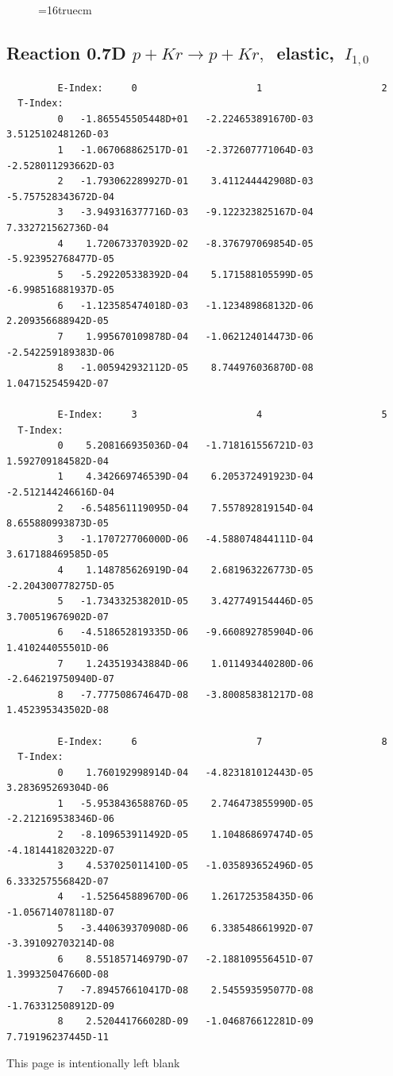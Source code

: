 \documentclass[12pt,dvips]{article}
\begin{document}
\begin{figure} \label{0.7T}
\epsfxsize=16truecm
\end{figure}
\newpage

\subsection{
Reaction 0.7D  $p + Kr \rightarrow p + Kr ,\ $
 elastic, $\  I_{1,0}$
}

\begin{small}\begin{verbatim}
         E-Index:     0                     1                     2
  T-Index:
         0   -1.865545505448D+01   -2.224653891670D-03    3.512510248126D-03
         1   -1.067068862517D-01   -2.372607771064D-03   -2.528011293662D-03
         2   -1.793062289927D-01    3.411244442908D-03   -5.757528343672D-04
         3   -3.949316377716D-03   -9.122323825167D-04    7.332721562736D-04
         4    1.720673370392D-02   -8.376797069854D-05   -5.923952768477D-05
         5   -5.292205338392D-04    5.171588105599D-05   -6.998516881937D-05
         6   -1.123585474018D-03   -1.123489868132D-06    2.209356688942D-05
         7    1.995670109878D-04   -1.062124014473D-06   -2.542259189383D-06
         8   -1.005942932112D-05    8.744976036870D-08    1.047152545942D-07

         E-Index:     3                     4                     5
  T-Index:
         0    5.208166935036D-04   -1.718161556721D-03    1.592709184582D-04
         1    4.342669746539D-04    6.205372491923D-04   -2.512144246616D-04
         2   -6.548561119095D-04    7.557892819154D-04    8.655880993873D-05
         3   -1.170727706000D-06   -4.588074844111D-04    3.617188469585D-05
         4    1.148785626919D-04    2.681963226773D-05   -2.204300778275D-05
         5   -1.734332538201D-05    3.427749154446D-05    3.700519676902D-07
         6   -4.518652819335D-06   -9.660892785904D-06    1.410244055501D-06
         7    1.243519343884D-06    1.011493440280D-06   -2.646219750940D-07
         8   -7.777508674647D-08   -3.800858381217D-08    1.452395343502D-08

         E-Index:     6                     7                     8
  T-Index:
         0    1.760192998914D-04   -4.823181012443D-05    3.283695269304D-06
         1   -5.953843658876D-05    2.746473855990D-05   -2.212169538346D-06
         2   -8.109653911492D-05    1.104868697474D-05   -4.181441820322D-07
         3    4.537025011410D-05   -1.035893652496D-05    6.333257556842D-07
         4   -1.525645889670D-06    1.261725358435D-06   -1.056714078118D-07
         5   -3.440639370908D-06    6.338548661992D-07   -3.391092703214D-08
         6    8.551857146979D-07   -2.188109556451D-07    1.399325047660D-08
         7   -7.894576610417D-08    2.545593595077D-08   -1.763312508912D-09
         8    2.520441766028D-09   -1.046876612281D-09    7.719196237445D-11

\end{verbatim}\end{small}
\newpage
This page is intentionally left blank
\newpage
\end{document}
